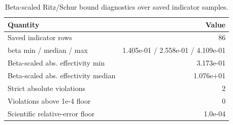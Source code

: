 \begin{table}
\centering
\small
\caption{Beta-scaled Ritz/Schur bound diagnostics over saved indicator samples.}
\label{tab:bound}
\begin{tabular}{lr}
\toprule
Quantity & Value \\
\midrule
Saved indicator rows & 86 \\
beta min / median / max & 1.405e-01 / 2.558e-01 / 4.109e-01 \\
Beta-scaled abs. effectivity min & 3.173e-01 \\
Beta-scaled abs. effectivity median & 1.076e+01 \\
Strict absolute violations & 2 \\
Violations above 1e-4 floor & 0 \\
Scientific relative-error floor & 1.0e-04 \\
\bottomrule
\end{tabular}
\end{table}
